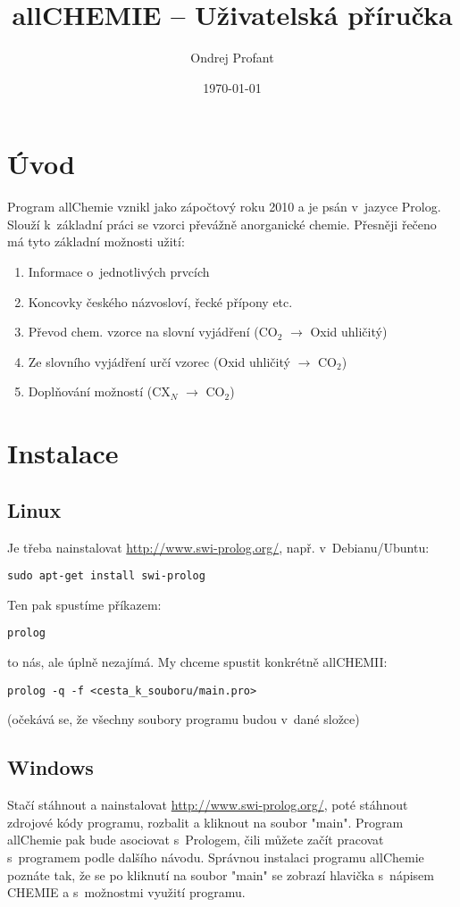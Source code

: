 \documentclass[a4paper]{article}
\title{allCHEMIE -- Uživatelská příručka}
\author{Ondrej Profant}
\date{\today}
\begin{document}
\maketitle
\newpage
\tableofcontents
\newpage
\section{Úvod}
Program allChemie vznikl jako zápočtový roku 2010 a je psán v~jazyce Prolog. Slouží k~základní práci se vzorci převážně anorganické chemie. Přesněji řečeno má tyto základní možnosti užití:
\begin{enumerate}
\item Informace o~jednotlivých prvcích
\item Koncovky českého názvosloví, řecké přípony etc.
\item Převod chem. vzorce na slovní vyjádření (CO$_2$ $\rightarrow$ Oxid uhličitý)
\item Ze slovního vyjádření určí vzorec (Oxid uhličitý $\rightarrow$ CO$_2$)
\item Doplňování možností (CX$_N$ $\rightarrow$ CO$_2$)

\end{enumerate}
\section{Instalace} 
\subsection{Linux}
Je třeba nainstalovat \href{swi-prolog}{http://www.swi-prolog.org/}, např. v~Debianu/Ubuntu:
\begin{verbatim}
sudo apt-get install swi-prolog
\end{verbatim}
Ten pak spustíme příkazem:

\begin{verbatim}
prolog
\end{verbatim}

to nás, ale úplně nezajímá. My chceme spustit konkrétně allCHEMII:
\begin{verbatim}
prolog -q -f <cesta_k_souboru/main.pro>
\end{verbatim}
(očekává se, že všechny soubory programu budou v~dané složce)
\subsection{Windows}
Stačí stáhnout a nainstalovat \href{swi-prolog}{http://www.swi-prolog.org/}, poté stáhnout zdrojové kódy programu, rozbalit a kliknout na soubor "main". Program allChemie pak bude asociovat s~Prologem, čili můžete začít pracovat s~programem podle dalšího návodu. Správnou instalaci programu allChemie poznáte tak, že se po kliknutí na soubor "main" se zobrazí hlavička s~nápisem CHEMIE a s~možnostmi využití programu.
\end{document}
